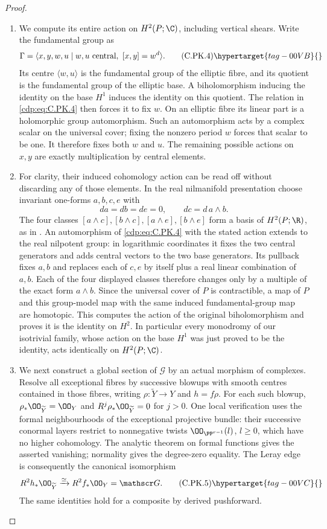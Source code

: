 \begin{proof}
\begin{enumerate}[label={$\langle1\rangle$\arabic*.},leftmargin=*]
\item We compute its entire action on $H^2(P;\C)$, including
vertical shears. Write the fundamental group as
\[
 \Gamma=\langle x,y,w,u\mid
       w,u\text{ central},\ [x,y]=w^d\rangle.
\tag{C.PK.4}\hypertarget{tag-00VB}{}\label{cdp:eq:C.PK.4}
\]
Its centre $\langle w,u\rangle$ is the fundamental group
of the elliptic fibre, and its quotient is the fundamental
group of the elliptic base. A biholomorphism inducing the
identity on the base $H^1$ induces the identity on this
quotient. The relation in \eqref{cdp:eq:C.PK.4} then forces it to fix
$w$. On an elliptic fibre its linear part is a holomorphic
group automorphism. Such an automorphism acts by a complex
scalar on the universal cover; fixing the nonzero period
$w$ forces that scalar to be one. It therefore fixes both
$w$ and $u$. The remaining possible actions on $x,y$ are
exactly multiplication by central elements.

\item For clarity, their induced cohomology action can be read
off without discarding any of those elements. In the real
nilmanifold presentation choose invariant one-forms
$a,b,c,e$ with
\[
 da=db=de=0,\qquad dc=d\,a\wedge b.
\]
The four classes $[a\wedge c],[b\wedge c],
[a\wedge e],[b\wedge e]$ form a basis of
$H^2(P;\R)$, as in \cite[\S3]{Borcea1984}.
An automorphism of \eqref{cdp:eq:C.PK.4} with the stated action extends
to the real nilpotent group: in logarithmic coordinates it
fixes the two central generators and adds central vectors
to the two base generators. Its pullback fixes $a,b$ and
replaces each of $c,e$ by itself plus a real linear
combination of $a,b$. Each of the four displayed classes
therefore changes only by a multiple of the exact form
$a\wedge b$. Since the universal cover of $P$ is
contractible, a map of $P$ and this group-model map with
the same induced fundamental-group map are homotopic.
This computes the action of the original biholomorphism
and proves it is the identity on $H^2$.
In particular every monodromy of our isotrivial family,
whose action on the base $H^1$ was just proved to be the
identity, acts identically on $H^2(P;\C)$.

\item We next construct a global section of $\mathscr G$ by an
actual morphism of complexes. Resolve all exceptional
fibres by successive blowups with smooth centres contained
in those fibres, writing
$\rho:\widetilde Y\to Y$ and $h=f\rho$. For each such
blowup, $\rho_*\OO_{\widetilde Y}=\OO_Y$ and
$R^j\rho_*\OO_{\widetilde Y}=0$ for $j>0$.
One local verification uses the formal neighbourhoods of
the exceptional projective bundle: their successive
conormal layers restrict to nonnegative twists
$\OO_{\PP^{r-1}}(l)$, $l\ge0$, which have no higher
cohomology. The analytic theorem on formal functions
gives the asserted vanishing; normality gives the
degree-zero equality. The Leray edge is consequently the
canonical isomorphism
\[
 R^2h_*\OO_{\widetilde Y}\xrightarrow{\simeq}
 R^2f_*\OO_Y=\mathscr G.
\tag{C.PK.5}\hypertarget{tag-00VC}{}\label{cdp:eq:C.PK.5}
\]
The same identities hold for a composite by derived
pushforward.


\end{enumerate}
\end{proof}
